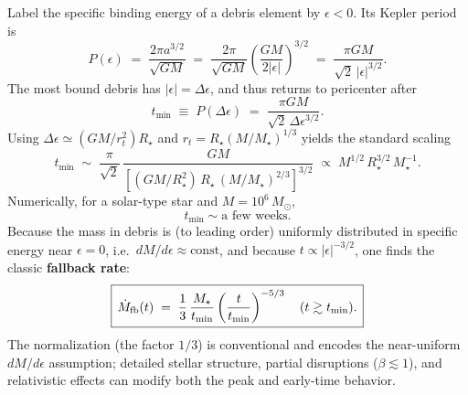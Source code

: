 Label the specific binding energy of a debris element by $\epsilon<0$. Its Kepler period is
\[
P(\epsilon) \;=\; \frac{2\pi a^{3/2}}{\sqrt{GM}}
\;=\; \frac{2\pi}{\sqrt{GM}}\left(\frac{GM}{2|\epsilon|}\right)^{3/2}
\;=\; \frac{\pi GM}{\sqrt{2}\,|\epsilon|^{3/2}}.
\]
The most bound debris has $|\epsilon|=\Delta\epsilon$, and thus returns to pericenter after
\begin{equation}
\label{eq:tmin}
\boxed{\,t_{\min} \;\equiv\; P(\Delta\epsilon) \;=\; \frac{\pi GM}{\sqrt{2}\,\Delta\epsilon^{3/2}}.\,}
\end{equation}
Using $\Delta\epsilon \simeq (GM/r_t^2)R_\star$ and $r_t = R_\star(M/M_\star)^{1/3}$ yields the standard scaling
\[
t_{\min} \;\sim\; \frac{\pi}{\sqrt{2}}\,
\frac{GM}{\left[(GM/R_\star^2)\,R_\star\,(M/M_\star)^{2/3}\right]^{3/2}}
\;\propto\; M^{1/2}\,R_\star^{3/2}\,M_\star^{-1}.
\]
Numerically, for a solar-type star and $M=10^6\,M_\odot$,
\[
t_{\min} \sim \text{a few weeks}.
\]
Because the mass in debris is (to leading order) uniformly distributed in specific energy near $\epsilon=0$, i.e.\ $dM/d\epsilon \approx \text{const}$, and because $t\propto |\epsilon|^{-3/2}$, one finds the classic \textbf{fallback rate}:
\begin{equation}
\label{eq:fallback}
\boxed{\,\dot M_{\rm fb}(t) \;=\; \frac{1}{3}\,\frac{M_\star}{t_{\min}}
\left(\frac{t}{t_{\min}}\right)^{-5/3} \quad (t \gtrsim t_{\min}).\,}
\end{equation}
The normalization (the factor $1/3$) is conventional and encodes the near-uniform $dM/d\epsilon$ assumption; detailed stellar structure, partial disruptions ($\beta\lesssim 1$), and relativistic effects can modify both the peak and early-time behavior.



